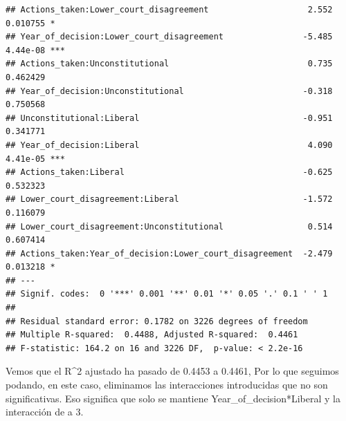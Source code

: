 \documentclass[
]{article}
\begin{document}
\begin{verbatim}
## Actions_taken:Lower_court_disagreement                    2.552 0.010755 *  
## Year_of_decision:Lower_court_disagreement                -5.485 4.44e-08 ***
## Actions_taken:Unconstitutional                            0.735 0.462429    
## Year_of_decision:Unconstitutional                        -0.318 0.750568    
## Unconstitutional:Liberal                                 -0.951 0.341771    
## Year_of_decision:Liberal                                  4.090 4.41e-05 ***
## Actions_taken:Liberal                                    -0.625 0.532323    
## Lower_court_disagreement:Liberal                         -1.572 0.116079    
## Lower_court_disagreement:Unconstitutional                 0.514 0.607414    
## Actions_taken:Year_of_decision:Lower_court_disagreement  -2.479 0.013218 *  
## ---
## Signif. codes:  0 '***' 0.001 '**' 0.01 '*' 0.05 '.' 0.1 ' ' 1
## 
## Residual standard error: 0.1782 on 3226 degrees of freedom
## Multiple R-squared:  0.4488, Adjusted R-squared:  0.4461 
## F-statistic: 164.2 on 16 and 3226 DF,  p-value: < 2.2e-16
\end{verbatim}

Vemos que el R\^{}2 ajustado ha pasado de 0.4453 a 0.4461, Por lo que
seguimos podando, en este caso, eliminamos las interacciones
introducidas que no son significativas. Eso significa que solo se
mantiene Year\_of\_decision*Liberal y la interacción de a 3.
\end{document}
